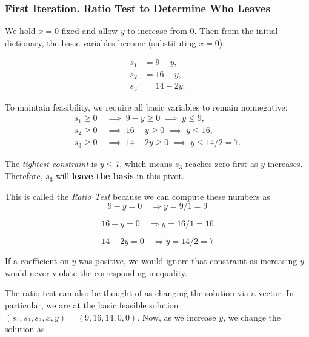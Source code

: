 \subsubsection*{First Iteration. Ratio Test to Determine Who Leaves}

\begin{tcolorbox}[colback=algleave!6, colframe=algleave, coltitle=white, fonttitle=\bfseries, sharp corners, title={\ding{47}\ First Iteration: Ratio Test}]

We hold \(x = 0\) fixed and allow \(y\) to increase from \(0\).  
Then from the initial dictionary, the basic variables become (substituting \(x = 0\)):

\[
\begin{aligned}
s_1 &= 9 - y, \\
s_2 &= 16 - y, \\
s_3 &= 14 - 2y.
\end{aligned}
\]

To maintain feasibility, we require all basic variables to remain nonnegative:
\[
\begin{aligned}
s_1 \ge 0 &\;\implies\; 9 - y \ge 0 \;\implies\; y \le 9, \\
s_2 \ge 0 &\;\implies\; 16 - y \ge 0 \;\implies\; y \le 16, \\
s_3 \ge 0 &\;\implies\; 14 - 2y \ge 0 \;\implies\; y \le 14/2 = 7.
\end{aligned}
\]

The \emph{tightest constraint} is \(y \le 7\), which means \(s_3\) reaches zero first as \(y\) increases.  
Therefore, \(\boxed{s_3}\) will \textbf{leave the basis} in this pivot.

\end{tcolorbox}

This is called the \emph{Ratio Test} because we can compute these numbers as 
$$
9 - y = 0 \quad \Rightarrow y = 9 / 1 = 9
$$

$$
16 - y = 0 \quad \Rightarrow y = 16 / 1 = 16
$$

$$
14 - 2y = 0 \quad \Rightarrow y = 14 / 2 = 7
$$

If a coefficient on $y$ was positive, we would ignore that constraint as increasing $y$ would never violate the corresponding inequality.

The ratio test can also be thought of as changing the solution via a vector.  In particular, we are at the basic feasible solution $(s_1, s_2, s_3, x,y) = (9,16,14,0,0)$.  Now, as we increase $y$, we change the solution as 

